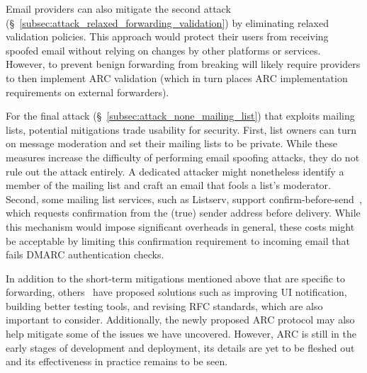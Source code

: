 Email providers can also mitigate the second attack (\S~\ref{subsec:attack_relaxed_forwarding_validation}) by eliminating
relaxed validation policies.  This approach would protect their users
from receiving spoofed email without relying on changes by other
platforms or services.  However, to prevent benign forwarding from
breaking will likely require providers to then implement ARC
validation (which in turn places ARC implementation requirements on
external forwarders).


For the final attack (\S~\ref{subsec:attack_none_mailing_list}) that exploits mailing lists, potential mitigations trade usability for security.
First, list owners can turn on message moderation and set their mailing lists to be private.
While these measures increase the difficulty of performing email spoofing attacks, they do not rule out the attack entirely. A dedicated attacker might
nonetheless identify a member of the mailing list and craft an email
that fools a list's moderator.
Second, some mailing list services, such as Listserv, support confirm-before-send~\cite{OnmyLIST7:online}, which requests confirmation from the (true) sender address before delivery.  While this mechanism would impose significant overheads in general, these costs might be acceptable by limiting this confirmation requirement to incoming email that fails DMARC authentication checks.

In addition to the short-term mitigations mentioned above that are
specific to forwarding, others~\cite{chen2020composition,shen2020weak}
have proposed solutions such as improving UI notification, building
better testing tools, and revising RFC standards, which are also
important to consider. Additionally, the newly proposed ARC protocol
may also help mitigate some of the issues we have uncovered. However,
ARC is still in the early stages of development and deployment, 
its details are yet to be fleshed out and its effectiveness in
practice remains to be seen.

